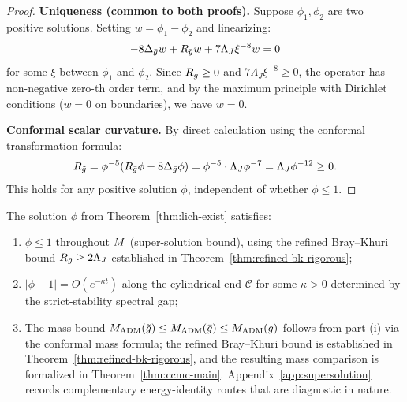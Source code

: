 \begin{proof}
\bigskip

\textbf{Uniqueness (common to both proofs).} Suppose $\phi_1, \phi_2$ are two positive solutions. Setting $w = \phi_1 - \phi_2$ and linearizing:
\[
-8\Delta_{\bar{g}}w + R_{\bar{g}}w + 7\Lambda_J \xi^{-8}w = 0
\]
for some $\xi$ between $\phi_1$ and $\phi_2$. Since $R_{\bar{g}} \geq 0$ and $7\Lambda_J \xi^{-8} \geq 0$, the operator has non-negative zero-th order term, and by the maximum principle with Dirichlet conditions ($w = 0$ on boundaries), we have $w = 0$.

\textbf{Conformal scalar curvature.} By direct calculation using the conformal transformation formula:
\[
R_{\tilde{g}} = \phi^{-5}(R_{\bar{g}}\phi - 8\Delta_{\bar{g}}\phi) = \phi^{-5} \cdot \Lambda_J \phi^{-7} = \Lambda_J \phi^{-12} \geq 0.
\]
This holds for any positive solution $\phi$, independent of whether $\phi \leq 1$.
\end{proof}

\begin{lemma}\label{lem:phi-bound}
The solution $\phi$ from Theorem~\ref{thm:lich-exist} satisfies:
\begin{enumerate}[label=\textup{(\roman*)}]
    \item $\phi \leq 1$ throughout $\bar{M}$ (super-solution bound), using the refined Bray--Khuri bound $R_{\bar{g}} \geq 2\Lambda_J$ established in Theorem~\ref{thm:refined-bk-rigorous};
    \item $|\phi - 1| = O(e^{-\kappa t})$ along the cylindrical end $\mathcal{C}$ for some $\kappa > 0$ determined by the strict-stability spectral gap;
    \item The mass bound $M_{\mathrm{ADM}}(\tilde{g}) \leq M_{\mathrm{ADM}}(\bar{g}) \leq M_{\mathrm{ADM}}(g)$ follows from part (i) via the conformal mass formula; the refined Bray--Khuri bound is established in Theorem~\ref{thm:refined-bk-rigorous}, and the resulting mass comparison is formalized in Theorem~\ref{thm:ccmc-main}. Appendix~\ref{app:supersolution} records complementary energy-identity routes that are diagnostic in nature.
\end{enumerate}
\end{lemma}

